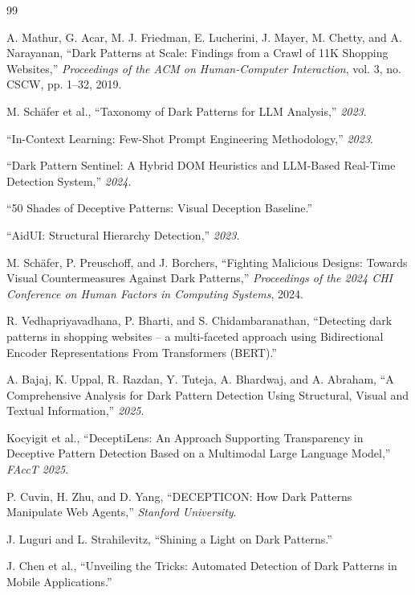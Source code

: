 \documentclass[12pt,a4paper]{article}
\begin{document}
\newpage
\begin{thebibliography}{99}

A. Mathur, G. Acar, M. J. Friedman, E. Lucherini, J. Mayer, M. Chetty, and A. Narayanan, 
``Dark Patterns at Scale: Findings from a Crawl of 11K Shopping Websites,'' 
\textit{Proceedings of the ACM on Human-Computer Interaction}, vol. 3, no. CSCW, pp. 1--32, 2019.

M. Schäfer et al., 
``Taxonomy of Dark Patterns for LLM Analysis,'' 
\textit{2023}.

``In-Context Learning: Few-Shot Prompt Engineering Methodology,'' \textit{2023}.

``Dark Pattern Sentinel: A Hybrid DOM Heuristics and LLM-Based Real-Time Detection System,'' \textit{2024}.

``50 Shades of Deceptive Patterns: Visual Deception Baseline.''

``AidUI: Structural Hierarchy Detection,'' \textit{2023}.

M. Schäfer, P. Preuschoff, and J. Borchers, 
``Fighting Malicious Designs: Towards Visual Countermeasures Against Dark Patterns,'' 
\textit{Proceedings of the 2024 CHI Conference on Human Factors in Computing Systems}, 2024.

R. Vedhapriyavadhana, P. Bharti, and S. Chidambaranathan, 
``Detecting dark patterns in shopping websites – a multi-faceted approach using Bidirectional Encoder Representations From Transformers (BERT).''

A. Bajaj, K. Uppal, R. Razdan, Y. Tuteja, A. Bhardwaj, and A. Abraham, 
``A Comprehensive Analysis for Dark Pattern Detection Using Structural, Visual and Textual Information,'' \textit{2025}.

Kocyigit et al., 
``DeceptiLens: An Approach Supporting Transparency in Deceptive Pattern Detection Based on a Multimodal Large Language Model,'' \textit{FAccT 2025}.

P. Cuvin, H. Zhu, and D. Yang, 
``DECEPTICON: How Dark Patterns Manipulate Web Agents,'' \textit{Stanford University}.

J. Luguri and L. Strahilevitz, 
``Shining a Light on Dark Patterns.''

J. Chen et al., 
``Unveiling the Tricks: Automated Detection of Dark Patterns in Mobile Applications.''


\end{thebibliography}
\end{document}
